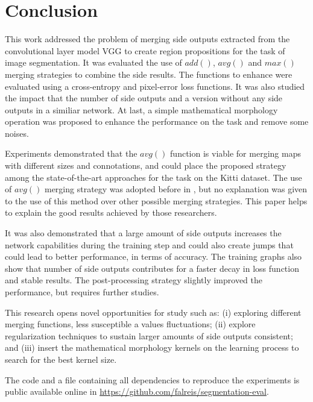 \section{Conclusion}
\label{sec:conclusion}

This work addressed the problem of merging side outputs extracted from the convolutional layer model VGG to create region propositions for the task of image segmentation. It was evaluated the use of $add()$, $avg()$ and $max()$ merging strategies to combine the side results. The functions to enhance were evaluated using a cross-entropy and pixel-error loss functions. It was also studied the impact that the number of side outputs and a version without any side outputs in a similiar network. At last, a simple mathematical morphology operation was proposed to  enhance the performance on the task and remove some noises. 

Experiments demonstrated that the $avg()$ function is viable for merging maps with different sizes and connotations, and could place the proposed strategy among the state-of-the-art approaches for the task on the Kitti dataset. The use of $avg()$ merging strategy was adopted before in \cite{liu2017}, but no explanation was given to the use of this method over other possible merging strategies. This paper helps to explain the good results achieved by those researchers.

It was also demonstrated that a large amount of side outputs increases the network capabilities during the training step and could also create jumps that could lead to better performance, in terms of accuracy. The training graphs also show that number of side outputs contributes for a faster decay in loss function and stable results. The post-processing strategy slightly improved the performance, but requires further studies.

This research opens novel opportunities for study such as: (i) exploring different merging functions, less susceptible a values fluctuations;  (ii) explore regularization techniques to sustain larger amounts of side outputs consistent; and (iii) insert the mathematical morphology kernels on the learning process to search for the best kernel size. 
 
The code  and a file containing all dependencies to reproduce the experiments is public available online in \url{https://github.com/falreis/segmentation-eval}. 
